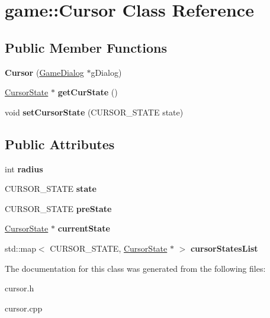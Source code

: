 \hypertarget{classgame_1_1Cursor}{}\section{game\+:\+:Cursor Class Reference}
\label{classgame_1_1Cursor}
\subsection*{Public Member Functions}
\begin{DoxyCompactItemize}
\item 
\mbox{\label{classgame_1_1Cursor_a9ad1627496feb7657d543f3c97f3f257}} 
{\bfseries Cursor} (\hyperlink{classgame_1_1GameDialog}{Game\+Dialog} $\ast$g\+Dialog)
\item 
\mbox{\label{classgame_1_1Cursor_a575adecc55a1a2016665e2ba3ce98926}} 
\hyperlink{classgame_1_1CursorState}{Cursor\+State} $\ast$ {\bfseries get\+Cur\+State} ()
\item 
\mbox{\label{classgame_1_1Cursor_af2bd780f93874d177d93db3fe381665f}} 
void {\bfseries set\+Cursor\+State} (C\+U\+R\+S\+O\+R\+\_\+\+S\+T\+A\+TE state)
\end{DoxyCompactItemize}
\subsection*{Public Attributes}
\begin{DoxyCompactItemize}
\item 
\mbox{\label{classgame_1_1Cursor_a50c0c4ad740ebd7529c22c4bb7f94206}} 
int {\bfseries radius}
\item 
\mbox{\label{classgame_1_1Cursor_a694099e5d3c5909ddb7b8f54082c74d6}} 
C\+U\+R\+S\+O\+R\+\_\+\+S\+T\+A\+TE {\bfseries state}
\item 
\mbox{\label{classgame_1_1Cursor_aa0acb0a05afd3a037ed3af9a8afa7949}} 
C\+U\+R\+S\+O\+R\+\_\+\+S\+T\+A\+TE {\bfseries pre\+State}
\item 
\mbox{\label{classgame_1_1Cursor_a50aaaa67c87c62315901e4f97a5e3049}} 
\hyperlink{classgame_1_1CursorState}{Cursor\+State} $\ast$ {\bfseries current\+State}
\item 
\mbox{\label{classgame_1_1Cursor_adee1bb58f743e9c346c981f7b697ae0e}} 
std\+::map$<$ C\+U\+R\+S\+O\+R\+\_\+\+S\+T\+A\+TE, \hyperlink{classgame_1_1CursorState}{Cursor\+State} $\ast$ $>$ {\bfseries cursor\+States\+List}
\end{DoxyCompactItemize}


The documentation for this class was generated from the following files\+:\begin{DoxyCompactItemize}
\item 
cursor.\+h\item 
cursor.\+cpp\end{DoxyCompactItemize}

